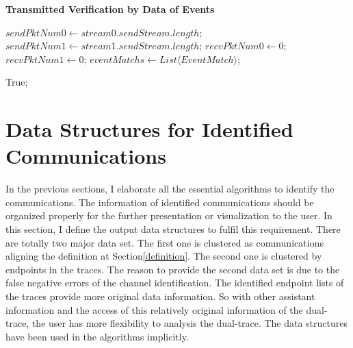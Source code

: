 \begin{algorithm}[H]
\DontPrintSemicolon
\caption{{\bf Transmitted Verification by Data of Events } \label{dataAlg2}}
$sendPktNum0 \leftarrow stream0.sendStream.length$;\;
$sendPktNum1 \leftarrow stream1.sendStream.length$;\;
$recvPktNum0 \leftarrow 0$;\;
$recvPktNum1 \leftarrow 0$;\;
$eventMatchs \leftarrow List \langle EventMatch \rangle$;\;



 \KwRet True;\;
\end{algorithm}



\section{Data Structures for Identified Communications}
In the previous sections, I elaborate all the essential algorithms to identify the communications. The information of identified communications should be organized properly for the further presentation or visualization to the user. In this section, I define the output data structures to fulfil this requirement. There are totally two major data set. The first one is clustered as communications aligning the definition at Section\ref{definition}. The second one is clustered by endpoints in the traces. The reason to provide the second data set is due to the false negative errors of the channel identification. The identified endpoint lists of the traces provide more original data information. So with other assistant information and the access of this relatively original information of the dual-trace, the user has more flexibility to analysis the dual-trace. The data structures have been used in the algorithms implicitly.

